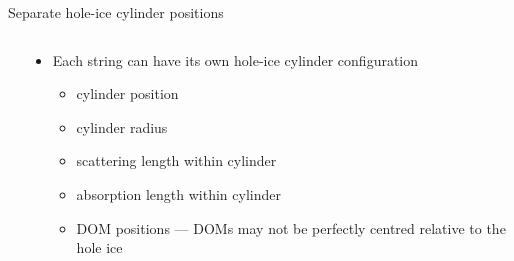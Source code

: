 
\begin{frame}[fragile]{Separate hole-ice cylinder positions}

  \begin{columns}
    \begin{column}{0.5\textwidth}


    \end{column}
    \begin{column}{0.5\textwidth}

      \begin{itemize}
        \item Each string can have its own hole-ice cylinder configuration
          \begin{itemize}
            \item cylinder position
            \item cylinder radius
            \item scattering length within cylinder
            \item absorption length within cylinder
            \item DOM positions --- DOMs may not be perfectly centred relative to the hole ice
          \end{itemize}


      \end{itemize}


    \end{column}
  \end{columns}

\end{frame}


